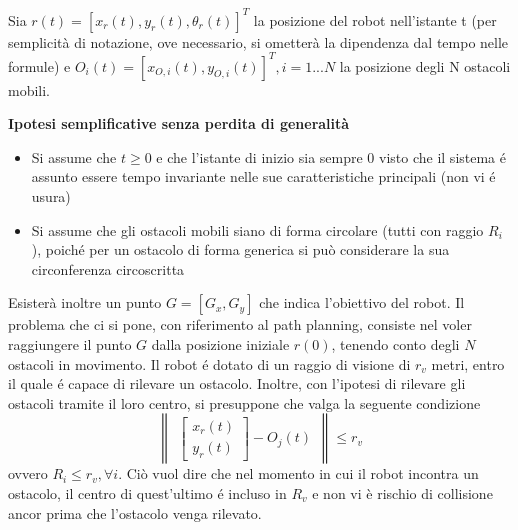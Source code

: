 \documentclass[14pt,a4paper]{extarticle}
\begin{document}
Sia \( r(t) = [x_r(t),y_r(t),\theta_r(t)]^T\) la posizione del robot nell'istante t (per semplicità di notazione, ove necessario, si ometterà la dipendenza dal tempo nelle formule) e \( O_i(t) = [x_{O,i}(t),y_{O,i}(t)]^T, i = 1...N\) la posizione degli N ostacoli mobili.
\begin{nota}
\textbf{Ipotesi semplificative senza perdita di generalità}
\begin{itemize}
\item Si assume che \(t \geq 0\) e che l'istante di inizio sia sempre 0 visto che il sistema é assunto essere tempo invariante nelle sue caratteristiche principali (non vi é usura)
\item Si assume che gli ostacoli mobili siano di forma circolare (tutti con raggio \(R_i\)), poiché per un ostacolo di forma generica si può considerare la sua circonferenza circoscritta
\end{itemize}
\end{nota}
Esisterà inoltre un punto \(G = [G_x, G_y]\) che indica l'obiettivo del robot. Il problema che ci si pone, con riferimento al path planning, consiste nel voler raggiungere il punto \(G\) dalla posizione iniziale \(r(0)\), tenendo conto degli \(N\) ostacoli in movimento. Il robot é dotato di un raggio di visione di \(r_v\) metri, entro il quale é capace di rilevare un ostacolo. Inoltre, con l'ipotesi di rilevare gli ostacoli tramite il loro centro, si presuppone che valga la seguente condizione
\[\begin{Vmatrix}\begin{bmatrix} x_r(t)\\ y_r(t) \end{bmatrix} - O_j(t)\end{Vmatrix} \leq r_v \] ovvero \( R_i \leq r_v, \forall i\). Ciò vuol dire che nel momento in cui il robot incontra un ostacolo, il centro di quest'ultimo é incluso in \(R_v\) e non vi è rischio di collisione ancor prima che l'ostacolo venga rilevato.
\end{document}

